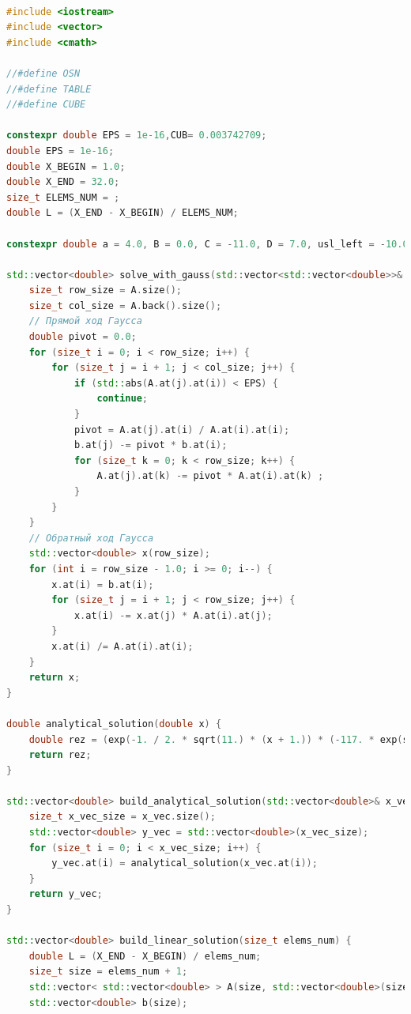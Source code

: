 \begin{lstlisting}[language=c++, label=prog,caption={\textit{Реализация МКЭ}}]

#include <iostream>
#include <vector>
#include <cmath>

//#define OSN 
//#define TABLE
//#define CUBE

constexpr double EPS = 1e-16,CUB= 0.003742709;
double EPS = 1e-16;
double X_BEGIN = 1.0;
double X_END = 32.0;
size_t ELEMS_NUM = ;
double L = (X_END - X_BEGIN) / ELEMS_NUM;

constexpr double a = 4.0, B = 0.0, C = -11.0, D = 7.0, usl_left = -10.0, usl_right = 5.0; // au"+Bu'+Cu+D=0

std::vector<double> solve_with_gauss(std::vector<std::vector<double>>& A, std::vector<double>& b){
    size_t row_size = A.size();
    size_t col_size = A.back().size();
    // Прямой ход Гаусса
    double pivot = 0.0;
    for (size_t i = 0; i < row_size; i++) {
        for (size_t j = i + 1; j < col_size; j++) {
            if (std::abs(A.at(j).at(i)) < EPS) {
                continue;
            }
            pivot = A.at(j).at(i) / A.at(i).at(i);
            b.at(j) -= pivot * b.at(i);
            for (size_t k = 0; k < row_size; k++) {
                A.at(j).at(k) -= pivot * A.at(i).at(k) ;
            }
        }
    }
    // Обратный ход Гаусса
    std::vector<double> x(row_size);
    for (int i = row_size - 1.0; i >= 0; i--) {
        x.at(i) = b.at(i);
        for (size_t j = i + 1; j < row_size; j++) {
            x.at(i) -= x.at(j) * A.at(i).at(j);
        }
        x.at(i) /= A.at(i).at(i);
    }
    return x;
}

double analytical_solution(double x) {
    double rez = (exp(-1. / 2. * sqrt(11.) * (x + 1.)) * (-117. * exp(sqrt(11.) * x) + 7. * exp(1. / 2. * sqrt(11.) * (x + 1.)) + 7. * exp(1. / 2. * sqrt(11.) * (x + 63.)) + 10. * sqrt(11.) * exp(1. / 2. * sqrt(11.) * (2. * x + 31.)) - 10. * sqrt(11.) * exp((33. * sqrt(11.))/2.) - 117. * exp(32. * sqrt(11.))))/(11. * (1. + exp(31. * sqrt(11.))));
    return rez;
}

std::vector<double> build_analytical_solution(std::vector<double>& x_vec) {
    size_t x_vec_size = x_vec.size();
    std::vector<double> y_vec = std::vector<double>(x_vec_size);
    for (size_t i = 0; i < x_vec_size; i++) {
        y_vec.at(i) = analytical_solution(x_vec.at(i));
    }
    return y_vec;
}

std::vector<double> build_linear_solution(size_t elems_num) {
    double L = (X_END - X_BEGIN) / elems_num;
    size_t size = elems_num + 1;
    std::vector< std::vector<double> > A(size, std::vector<double>(size));
    std::vector<double> b(size);
    

\end{lstlisting}
